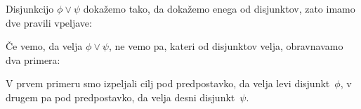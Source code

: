 Disjunkcijo $\phi \lor \psi$ dokažemo tako, da dokažemo enega od disjunktov, zato imamo dve pravili vpeljave:
%
\begin{boxDisplay}
  \begin{boxedProof}
    \begin{boxFrame}
    \end{boxFrame}
  \end{boxedProof}%
  \boxProofSep
  \begin{boxedProof}
    \begin{boxFrame}
    \end{boxFrame}
  \end{boxedProof}
\end{boxDisplay}
%
Če vemo, da velja $\phi \lor \psi$, ne vemo pa, kateri od disjunktov velja, obravnavamo dva primera:
%
\begin{boxDisplay}
  \begin{boxedProof}[reserved]
    \begin{boxFrame}
      \boxGap
      \begin{boxNested}[1]
      \end{boxNested}
      \begin{boxNested}[1]
      \end{boxNested}
    \end{boxFrame}
  \end{boxedProof}
\end{boxDisplay}
%
V prvem primeru smo izpeljali cilj pod predpostavko, da velja levi disjunkt~$\phi$, v drugem pa pod predpostavko, da velja desni disjunkt~$\psi$.

